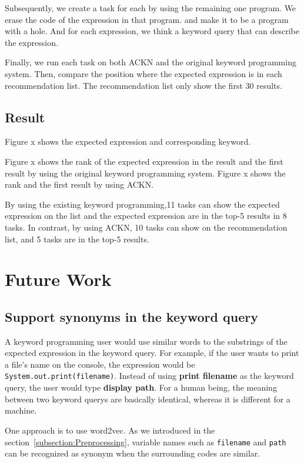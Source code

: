 \documentclass[PRO,english]{ipsj}
\begin{document}
Subsequently, we create a task for each by using the remaining one program. We erase the code of the expression in that program. and make it to be a program with a hole. And for each expression, we think a keyword query that can describe the expression. 

Finally, we run each task on both ACKN and the original keyword programming system. Then, compare the position where the expected expression is in each recommendation list. The recommendation list only show the first 30 results.

\subsection{Result}
Figure x shows the expected expression and corresponding keyword. 

Figure x shows the rank of the expected expression in the result and the first result by using the original keyword programming system. Figure x shows the rank and the first result by using ACKN.


By using the existing keyword programming,11 tasks can show the expected expression on the list and the expected expression are in the top-5 results in 8 tasks. In contrast, by using ACKN, 10 tasks can show on the recommendation list, and 5 tasks are in the top-5 results.

\section{Future Work}

\subsection{Support synonyms in the keyword query}
A keyword programming user would use similar words to the substrings of the expected expression in the keyword query. For example, if the user wants to print a file's name on the console, the expression would be \texttt{System.out.print(filename)}. Instead of using \textbf{print filename} as the keyword query, the user would type \textbf{display path}. For a human being, the meaning between two keyword querys are basically identical, whereas it is different for a machine. 

One approach is to use word2vec. As we introduced in the section~\ref{subsection:Preprocessing}, variable names such as \texttt{filename} and \texttt{path} can be recognized as synonym when the surrounding codes are similar. 
\end{document}
